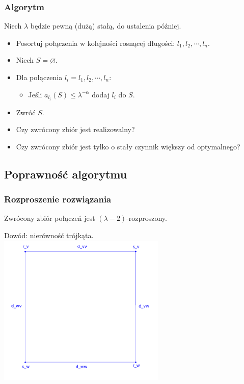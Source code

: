 \documentclass[polish, t,10pt]{beamer}
\begin{document}
\begin{frame}
    \frametitle{Algorytm}
    Niech $\lambda$ będzie pewną (dużą) stałą, do ustalenia później.
    \begin{itemize}
        \item Posortuj połączenia w kolejności rosnącej długości: $l_1, l_2, \cdots, l_n$.
        \item Niech $S = \varnothing$.
        \item Dla połączenia $l_i = l_1, l_2, \cdots, l_n$:
        \begin{itemize}
            \item Jeśli $a_{l_i}(S) \le \lambda^{-\alpha}$ dodaj $l_i$ do $S$.
        \end{itemize}
        \item Zwróć $S$.
    \end{itemize}
    \pause
    \vfill
    \begin{itemize}
        \item Czy zwrócony zbiór jest realizowalny?
        \pause
        \item Czy zwrócony zbiór jest tylko o stały czynnik większy od optymalnego?
    \end{itemize}
\end{frame}

\subsection{Poprawność algorytmu}
\begin{frame}
    \frametitle{Rozproszenie rozwiązania}
    \begin{lemma}
        Zwrócony zbiór połączeń jest $(\lambda - 2)$-rozproszony.
    \end{lemma}
    Dowód: nierówność trójkąta. \\
    \centering
    \includegraphics[width=0.6\textwidth]{pictures/triangle-inequality.png}
\end{frame}
\end{document}
